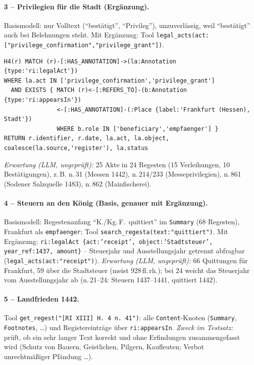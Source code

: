 \documentclass[10pt,a4paper]{article}
\newcommand{\code}[1]{\texttt{\small #1}}
\newcommand{\erg}{\textbf{Ergänzung}}
\begin{document}
\paragraph{3 -- Privilegien für die Stadt (\erg).}
Basismodell: nur Volltext (\enquote{bestätigt}, \enquote{Privileg}), unzuverlässig, weil \enquote{bestätigt} auch bei Belehnungen steht.
Mit Ergänzung: Tool \code{legal\_acts(act:[\allowbreak"privilege\_confirmation",\allowbreak "privilege\_grant"])}.
\begin{lstlisting}
H4(r) MATCH (r)-[:HAS_ANNOTATION]->(la:Annotation {type:'ri:legalAct'})
WHERE la.act IN ['privilege_confirmation','privilege_grant']
  AND EXISTS { MATCH (r)<-[:REFERS_TO]-(b:Annotation {type:'ri:appearsIn'})
               <-[:HAS_ANNOTATION]-(:Place {label:'Frankfurt (Hessen), Stadt'})
               WHERE b.role IN ['beneficiary','empfaenger'] }
RETURN r.identifier, r.date, la.act, la.object, coalesce(la.source,'register'), la.status
\end{lstlisting}
\emph{Erwartung (LLM, ungeprüft):} 25 Akte in 24 Regesten (15 Verleihungen, 10 Bestätigungen), z.\,B. n.\,31 (Messen 1442), n.\,214/233 (Messeprivilegien), n.\,861 (Sodener Salzquelle 1483), n.\,862 (Mainfischerei).

\paragraph{4 -- Steuern an den König (Basis, genauer mit \erg).}
Basismodell: Regestenanfang \enquote{K./Kg.\,F.\ quittiert} im \code{Summary} (68 Regesten), Frankfurt als \code{empfaenger}; Tool \code{search\_regesta(text:"quittiert")}.
Mit Ergänzung: \code{ri:legalAct \{act:'receipt', object:'Stadtsteuer', year\_ref:1437, amount\}} -- Steuerjahr und Ausstellungsjahr getrennt abfragbar (\code{legal\_acts(act:"receipt")}).
\emph{Erwartung (LLM, ungeprüft):} 66 Quittungen für Frankfurt, 59 über die Stadtsteuer (meist 928\,fl.\,rh.); bei 24 weicht das Steuerjahr vom Ausstellungsjahr ab (n.\,21--24: Steuern 1437--1441, quittiert 1442).

\paragraph{5 -- Landfrieden 1442.}
Tool \code{get\_regest("[RI XIII] H. 4 n. 41")}: alle \code{Content}-Knoten (\code{Summary}, \code{Footnotes}, \dots) und Registereinträge über \code{ri:appearsIn}.
\emph{Zweck im Testsatz:} prüft, ob ein sehr langer Text korrekt und ohne Erfindungen zusammengefasst wird (Schutz von Bauern, Geistlichen, Pilgern, Kaufleuten; Verbot unrechtmäßiger Pfändung \dots).
\end{document}
